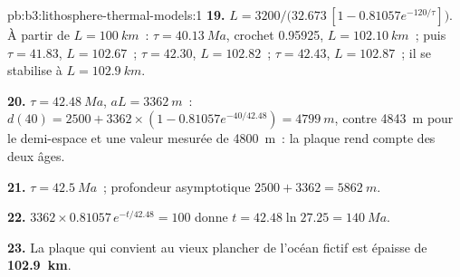 \begin{solution}{pb:b3:lithosphere-thermal-models:1}
\textbf{19.} $L = 3200/\bigl(32.673\,[1 - 0.81057e^{-120/\tau}]\bigr)$. À partir de
$L = \qty{100}{km}$~: $\tau = \qty{40.13}{Ma}$, crochet 0.95925, $L =
\qty{102.10}{km}$~; puis $\tau = 41.83$, $L = 102.67$~; $\tau = 42.30$, $L =
102.82$~; $\tau = 42.43$, $L = 102.87$~; il se stabilise à $L = \qty{102.9}{km}$.

\textbf{20.} $\tau = \qty{42.48}{Ma}$, $aL = \qty{3362}{m}$~: $d(40) = 2500 +
3362\times(1 - 0.81057e^{-40/42.48}) = \qty{4799}{m}$, contre \qty{4843}{m}
pour le demi-espace et une valeur mesurée de \qty{4800}{m}~: la plaque rend compte des deux âges.

\textbf{21.} $\tau = \qty{42.5}{Ma}$~; profondeur asymptotique $2500 + 3362 =
\qty{5862}{m}$.

\textbf{22.} $3362\times0.81057\,e^{-t/42.48} = 100$ donne $t = 42.48\ln27.25 =
\qty{140}{Ma}$.

\textbf{23.} La plaque qui convient au vieux plancher de l'océan fictif
est épaisse de \textbf{\qty[text-series-to-math=true]{102.9}{km}}.
\end{solution}
